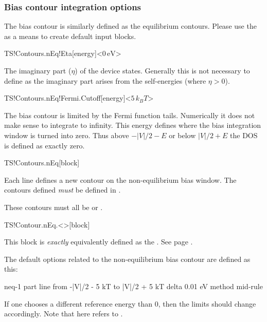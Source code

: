 \subsubsection{Bias contour integration options}

The bias contour is similarly defined as the equilibrium
contours. Please use the  as a means to
create default input blocks.

\begin{fdfentry}{TS!Contours.nEq!Eta}[energy]<$0\,\mathrm{eV}$>

  The imaginary part ($\eta$) of the device states. Generally this is
  not necessary to define as the imaginary part arises from the
  self-energies (where $\eta>0$). 
  
\end{fdfentry}

\begin{fdfentry}{TS!Contours.nEq!Fermi.Cutoff}[energy]<$5\,k_BT$>

  The bias contour is limited by the Fermi function tails. Numerically
  it does not make sense to integrate to infinity.
  This energy defines where the bias integration window is turned into
  zero. Thus above $-|V|/2-E$ or below $|V|/2+E$ the DOS is defined as
  exactly zero.

\end{fdfentry}

\begin{fdfentry}{TS!Contours.nEq}[block]

  Each line defines a new contour on the non-equilibrium bias
  window. The contours defined \emph{must} be defined in
  . 

  These contours must all be  or . 
  
\end{fdfentry}

\begin{fdfentry}{TS!Contour.nEq.<>}[block]

  This block is \emph{exactly} equivalently defined as the
  . See page \pageref{TS!Contour.<>}.
  
\end{fdfentry}

The default options related to the non-equilibrium bias contour are
defined as this:
\begin{fdfexample}
    neq-1
    part line
     from -|V|/2 - 5 kT to |V|/2 + 5 kT
       delta 0.01 eV
        method mid-rule
\end{fdfexample}
If one chooses a different reference energy than $0$, then the limits
should change accordingly. Note that here  refers to
.



